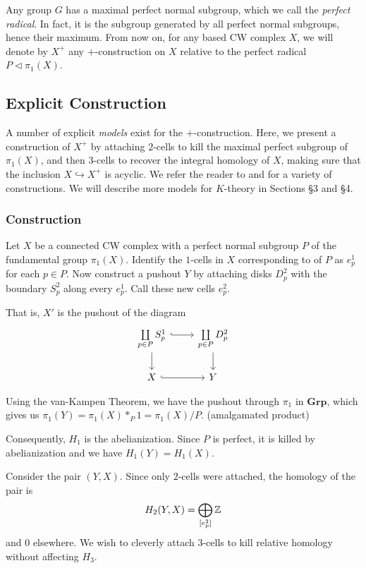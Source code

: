 \begin{remark}
Any group $G$ has a maximal perfect normal subgroup, which we call the \emph{perfect radical}. In fact, it is the subgroup generated by all perfect normal subgroups,
hence their maximum.
From now on, for any based CW complex $X$, we will denote by $X^+$ any $+$-construction on $X$ relative to the perfect radical $P \triangleleft \pi_1(X)$.
\end{remark}

\subsection{Explicit Construction} \label{ss:construction}
A number of explicit \emph{models} exist for the $+$-construction. Here, we present a construction of $X^+$ by attaching $2$-cells 
to kill the maximal perfect subgroup of $\pi_1(X)$, and then $3$-cells to recover the integral homology of $X$, making sure
that the inclusion $X \hookrightarrow X^+$ is acyclic.
We refer the reader to \cite{Gersten} and \cite{Suslin} for a variety of constructions. 
We will describe more models for $K$-theory in Sections \S3 and \S4.

\subsubsection*{Construction}
Let $X$ be a connected CW complex with a perfect normal subgroup $P$ of the fundamental group $\pi_1(X)$.
Identify the $1$-cells in $X$ corresponding to of $P$ as $e^1_p$ for each $p \in P$. 
Now construct a pushout $Y$ by attaching disks $D^2_p$ with the boundary $S^2_p$ along every $e^1_p$.
Call these new cells $e^2_p$.

That is, $X'$ is the pushout of the diagram 
\[
\begin{tikzcd}%
  \coprod\limits_{p \in P} S^1_{p} \arrow[r, hook] \arrow[d] & \coprod\limits_{p \in P} D^2_{p} \arrow[d] \\
  X \arrow[r, hook] & Y
\end{tikzcd}
\]

Using the van-Kampen Theorem, we have the pushout through $\pi_1$ in $\mathbf{Grp}$,
which gives us
  $\pi_1(Y) = \pi_1(X) *_{P} 1
         = \pi_1(X)/P$.
         (amalgamated product)

Consequently, $H_1$ is the abelianization. Since $P$ is perfect, it is killed by abelianization and we have
$ H_1(Y) = H_1(X)$.

Consider the pair $(Y,X)$. Since only $2$-cells were attached, the homology of the pair is
\[
H_2(Y,X) = \bigoplus_{[e^2_p]} \mathbb{Z}
\]
and $0$ elsewhere.
We wish to cleverly attach $3$-cells to kill relative homology without affecting $H_3$.

